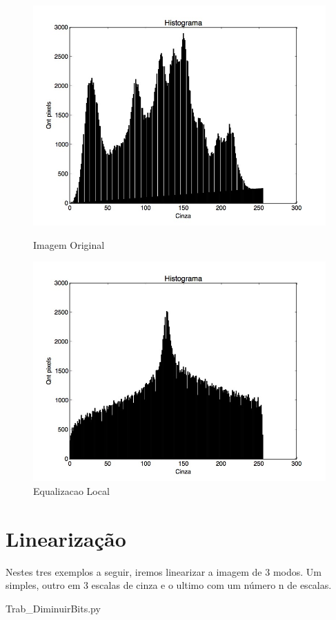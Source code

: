 \documentclass{article}
\begin{document}
\FloatBarrier
\begin{figure}[!htb]
\begin{minipage}[b]{0.45\linewidth}
\centering
\includegraphics[scale=0.25]{Histo_lena_B.jpg}
\caption{Imagem Original}
\label{fig:original}
\end{minipage}
\hspace{0.5cm}
\begin{minipage}[b]{0.45\linewidth}
\centering
\includegraphics[scale=0.25]{Histo_EqLocal.jpg}
\caption{Equalizacao Local}
\label{fig:rota}
\end{minipage}
\end{figure}
\FloatBarrier

\newpage
\section{Linearização}
Nestes tres exemplos a seguir, iremos linearizar a imagem de 3 modos. Um simples, outro em 3 escalas de cinza e o ultimo com um número n de escalas.

{Trab_DiminuirBits.py}
\end{document}
